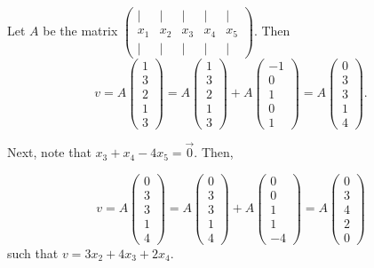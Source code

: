\documentclass[11pt]{article}
\begin{document}
\begin{enumerate}[1)]
\begin{solution}
Let $A$ be the matrix $\begin{pmatrix} | &| & | & | & | \\x_1 & x_2 & x_3 &x_4 &x_5 \\ | &| & | & | & | \end{pmatrix}$. Then $$v = A \begin{pmatrix} 1\\3\\2\\1\\3\end{pmatrix} = A \begin{pmatrix} 1\\3\\2\\1\\3\end{pmatrix} + A \begin{pmatrix} -1\\0\\1\\0\\1\end{pmatrix} = A \begin{pmatrix} 0\\3\\3\\1\\4\end{pmatrix}.$$


Next, note that $x_3 + x_4 -4x_5 = \vec{0}$. Then, 

$$v = A \begin{pmatrix} 0\\3\\3\\1\\4\end{pmatrix} = A \begin{pmatrix} 0\\3\\3\\1\\4\end{pmatrix} + A \begin{pmatrix} 0\\0\\1\\1\\-4\end{pmatrix} = A \begin{pmatrix} 0\\3\\4\\2\\0\end{pmatrix}$$
such that $v = 3x_2 + 4x_3 + 2x_4.$






\end{solution}
\end{enumerate}
\end{document}
